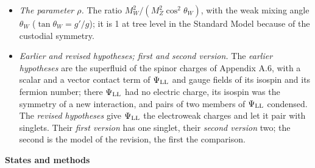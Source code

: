 \documentclass[
  10pt,
]{article}
\begin{document}
\begin{itemize}
  of \(SU(2)_L\); with the conjugate of the second they have the quantum
  numbers of two Higgs doublets, the scalar content of the models with
  two Higgs doublets.
\item
  \emph{The parameter \(\rho\).} The ratio
  \(M_W^2/(M_Z^2\cos^2\theta_W)\), with the weak mixing angle
  \(\theta_W\) (\(\tan\theta_W=g'/g\)); it is 1 at tree level in the
  Standard Model because of the custodial symmetry.
\item
  \emph{Earlier and revised hypotheses; first and second version.} The
  \emph{earlier hypotheses} are the superfluid of the spinor charges of
  Appendix A.6, with a scalar and a vector contact term of
  \(\Psi_{\rm LL}\) and gauge fields of its isospin and its fermion
  number; there \(\Psi_{\rm LL}\) had no electric charge, its isospin
  was the symmetry of a new interaction, and pairs of two members of
  \(\Psi_{\rm LL}\) condensed. The \emph{revised hypotheses} give
  \(\Psi_{\rm LL}\) the electroweak charges and let it pair with
  singlets. Their \emph{first version} has one singlet, their
  \emph{second version} two; the second is the model of the revision,
  the first the comparison.
\end{itemize}

\textbf{States and methods}
\end{document}
